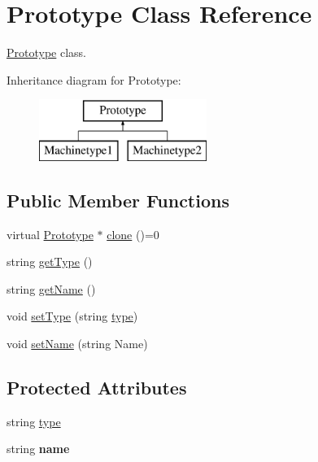 \hypertarget{classPrototype}{}\section{Prototype Class Reference}
\label{classPrototype}


\hyperlink{classPrototype}{Prototype} class.  


Inheritance diagram for Prototype\+:\begin{figure}[H]
\begin{center}
\leavevmode
\includegraphics[height=2.000000cm]{classPrototype}
\end{center}
\end{figure}
\subsection*{Public Member Functions}
\begin{DoxyCompactItemize}
\item 
virtual \hyperlink{classPrototype}{Prototype} $\ast$ \hyperlink{classPrototype_ab1ea90138cda9e68f368ebe8711428e7}{clone} ()=0
\item 
string \hyperlink{classPrototype_aaeb405998fccb4777c2651dfe2361628}{get\+Type} ()
\item 
string \hyperlink{classPrototype_a3a24a2b64dc329301c971e35adac4cc4}{get\+Name} ()
\item 
void \hyperlink{classPrototype_a5198d9e7e0dcd775c15111a719060f02}{set\+Type} (string \hyperlink{classPrototype_a2d6c59c7f19020c5c66bb1902d858992}{type})
\item 
void \hyperlink{classPrototype_a041609c27bad74826c98e6e4b0c78601}{set\+Name} (string Name)
\end{DoxyCompactItemize}
\subsection*{Protected Attributes}
\begin{DoxyCompactItemize}
\item 
string \hyperlink{classPrototype_a2d6c59c7f19020c5c66bb1902d858992}{type}
\item 
string {\bfseries name}\hypertarget{classPrototype_aa3f0d066a86e518800f81f760884a681}{}\label{classPrototype_aa3f0d066a86e518800f81f760884a681}

\end{DoxyCompactItemize}


